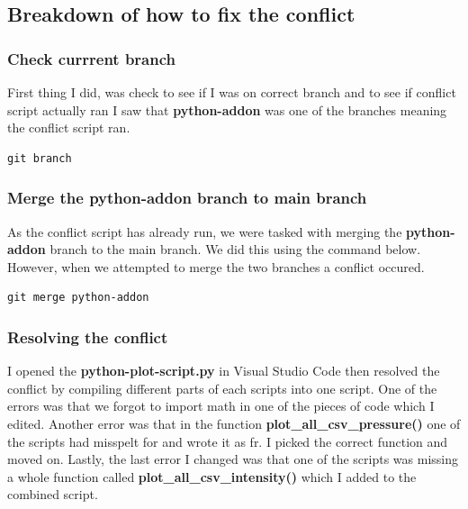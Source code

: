 \documentclass[]{article}
\begin{document}
\subsection{Breakdown of how to fix the conflict}
\subsubsection{Check currrent branch}
First thing I did, was check to see if I was on correct branch and to see if conflict script actually ran
I saw that \textbf{python-addon} was one of the branches meaning the conflict script ran.
\begin{tcolorbox}[colback=white, colframe=black, boxrule=1pt,
    fonttitle=\bfseries, listing only, listing options={language=sh, basicstyle=\ttfamily}]
\begin{verbatim}
git branch
\end{verbatim}
\end{tcolorbox}

\subsubsection{Merge the python-addon branch to main branch}
As the conflict script has already run, we were tasked with merging the \textbf{python-addon} branch to the main
branch. We did this using the command below. However, when we attempted to merge the two branches a conflict occured.
\begin{tcolorbox}[colback=white, colframe=black, boxrule=1pt,
    fonttitle=\bfseries, listing only, listing options={language=sh, basicstyle=\ttfamily}]
\begin{verbatim}
git merge python-addon
\end{verbatim}
\end{tcolorbox}

\subsubsection{Resolving the conflict}
I opened the \textbf{python-plot-script.py} in Visual Studio Code then resolved the conflict by compiling different
parts of each scripts into one script. One of the errors was that we forgot to import math in one of the pieces of code
which I edited. Another error was that in the function \textbf{plot\_all\_csv\_pressure()} one of the scripts had misspelt for and
wrote it as fr. I picked the correct function and moved on. Lastly, the last error I changed was that one of the scripts
was missing a whole function called \textbf{plot\_all\_csv\_intensity()} which I added to the combined script.
\end{document}
